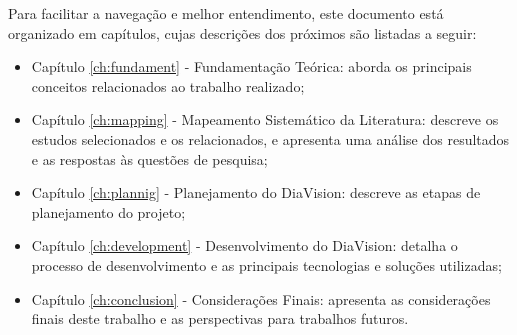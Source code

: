 Para facilitar a navegação e melhor entendimento, este documento está organizado em capítulos, cujas descrições dos próximos são listadas a seguir:
\begin{itemize}
    \item Capítulo \ref{ch:fundament} - Fundamentação Teórica: aborda os principais conceitos relacionados ao trabalho realizado;
    \item Capítulo \ref{ch:mapping} - Mapeamento Sistemático da Literatura: descreve os estudos selecionados e os relacionados,
     e apresenta uma análise dos resultados e as respostas às questões de pesquisa;
    \item Capítulo \ref{ch:plannig} - Planejamento do DiaVision: descreve as etapas de planejamento do projeto;
    \item Capítulo \ref{ch:development} - Desenvolvimento do DiaVision: detalha o processo de desenvolvimento e as principais tecnologias e soluções utilizadas;
    \item Capítulo \ref{ch:conclusion} - Considerações Finais: apresenta as considerações finais deste trabalho e as perspectivas para trabalhos futuros.
\end{itemize}
